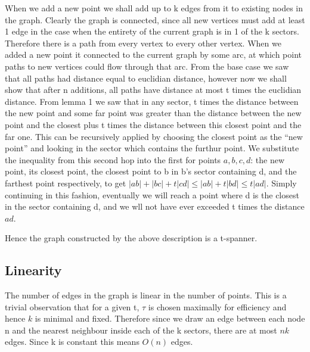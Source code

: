 \documentclass{article}
\begin{document}
When we add a new point we shall add up to k edges from it to existing nodes in the graph.
Clearly the graph is connected, since all new vertices must add at least 1 edge in the case when the entirety of the current graph is in 1 of the k sectors.
Therefore there is a path from every vertex to every other vertex.
When we added a new point it connected to the current graph by some arc, at which point paths to new vertices could flow through that arc.
From the base case we saw that all paths had distance equal to euclidian distance, however now we shall show that after n additions, all paths have distance at most t times the euclidian distance.
From lemma 1 we saw that in any sector, t times the distance between the new point and some far point was greater than the distance between the new point and the closest plus t times the distance between this closest point and the far one.
This can be recursively applied by choosing the closest point as the ``new point'' and looking in the sector which contains the furthur point.
We substitute the inequality from this second hop into the first for points $a, b, c, d$: the new point, its closest point, the closest point to b in b's sector containing d, and the farthest point respectively, to get $|ab| + |bc| + t|cd| \leq |ab| + t|bd| \leq t|ad|$.
Simply continuing in this fashion, eventually we will reach a point where d is the closest in the sector containing d, and we wll not have ever exceeded t times the distance $ad$.

Hence the graph constructed by the above description is a t-spanner.

\subsection*{Linearity}
The number of edges in the graph is linear in the number of points.
This is a trivial observation that for a given t, $\tau$ is chosen maximally for efficiency and hence $k$ is minimal and fixed.
Therefore since we draw an edge between each node n and the nearest neighbour inside each of the k sectors, there are at most $nk$ edges.
Since k is constant this means $O(n)$ edges.
\end{document}
